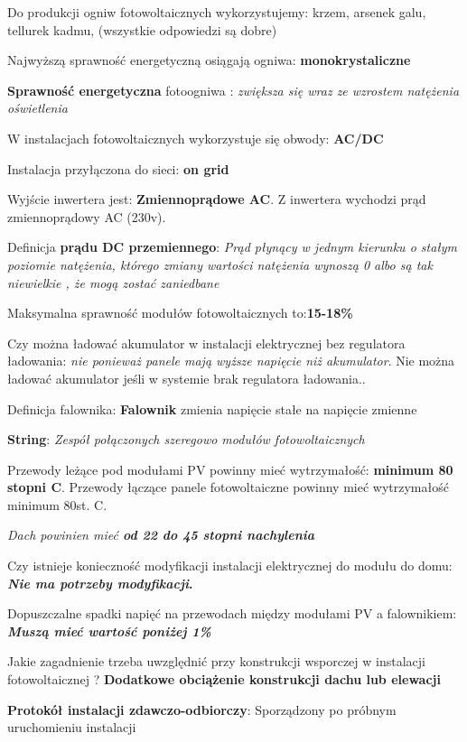 \documentclass[12pt,a4paper]{article}
\begin{document}
Do produkcji ogniw fotowoltaicznych wykorzystujemy:
krzem, arsenek galu, tellurek kadmu, (wszystkie odpowiedzi są dobre)

Najwyższą sprawność energetyczną osiągają ogniwa: \textbf{monokrystaliczne}

\textbf{Sprawność energetyczna} fotoogniwa :\textit{ zwiększa się wraz ze wzrostem natężenia oświetlenia}

W instalacjach fotowoltaicznych wykorzystuje się obwody: \textbf{AC/DC}

Instalacja przyłączona do sieci: \textbf{on grid}

Wyjście inwertera jest: \textbf{Zmiennoprądowe AC}. Z inwertera wychodzi prąd zmiennoprądowy AC (230v).

Definicja \textbf{prądu DC przemiennego}:
\textit{Prąd płynący w jednym kierunku o stałym poziomie natężenia, którego zmiany wartości natężenia wynoszą 0 albo są tak niewielkie , że mogą zostać zaniedbane}

Maksymalna sprawność modułów fotowoltaicznych to:\textbf{15-18\%}

Czy można ładować akumulator w instalacji elektrycznej bez regulatora ładowania:
\textit{nie ponieważ panele mają wyższe napięcie niż akumulator}. Nie można ładować akumulator jeśli w systemie brak regulatora ładowania..

Definicja falownika:\textbf{ Falownik} zmienia napięcie stałe na napięcie zmienne

\textbf{String}: \textit{Zespół połączonych szeregowo modułów fotowoltaicznych}

Przewody leżące pod modułami PV powinny mieć wytrzymałość: \textbf{minimum 80 stopni C}. Przewody łączące panele fotowoltaiczne powinny mieć wytrzymałość minimum 80st. C.


\textit{Dach powinien mieć \textbf{od 22 do 45 stopni nachylenia}}

Czy istnieje konieczność modyfikacji instalacji elektrycznej do modułu do domu:
\textbf{\textit{Nie ma potrzeby modyfikacji}.}

Dopuszczalne spadki napięć na przewodach między modułami PV a falownikiem:
\textbf{\textit{Muszą mieć wartość poniżej 1\%}}

Jakie zagadnienie trzeba uwzględnić przy konstrukcji wsporczej w instalacji fotowoltaicznej ? \textbf{Dodatkowe obciążenie konstrukcji dachu lub elewacji}

\textbf{Protokół instalacji zdawczo-odbiorczy}: Sporządzony po próbnym uruchomieniu instalacji 
\end{document}
